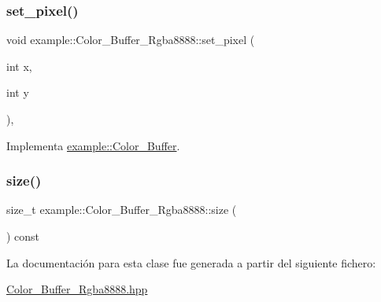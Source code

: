 \mbox{\label{classexample_1_1_color___buffer___rgba8888_aceb94fbc6797177c5a401f4d10d56766}} 
\subsubsection{\texorpdfstring{set\_pixel()}{set\_pixel()}\hspace{0.1cm}{\footnotesize\ttfamily [2/2]}}
{\footnotesize\ttfamily void example\+::\+Color\+\_\+\+Buffer\+\_\+\+Rgba8888\+::set\+\_\+pixel (\begin{DoxyParamCaption}\item[{int}]{x,  }\item[{int}]{y }\end{DoxyParamCaption})\hspace{0.3cm}{\ttfamily [inline]}, {\ttfamily [virtual]}}



Implementa \mbox{\hyperlink{classexample_1_1_color___buffer_a967ea326ec0889a36db523727a8154b5}{example\+::\+Color\+\_\+\+Buffer}}.

\mbox{\label{classexample_1_1_color___buffer___rgba8888_a635f30dda6b8e1851b444ff6e0d2a092}} 
\subsubsection{\texorpdfstring{size()}{size()}}
{\footnotesize\ttfamily size\+\_\+t example\+::\+Color\+\_\+\+Buffer\+\_\+\+Rgba8888\+::size (\begin{DoxyParamCaption}{ }\end{DoxyParamCaption}) const\hspace{0.3cm}{\ttfamily [inline]}}



La documentación para esta clase fue generada a partir del siguiente fichero\+:\begin{DoxyCompactItemize}
\item 
\mbox{\hyperlink{_color___buffer___rgba8888_8hpp}{Color\+\_\+\+Buffer\+\_\+\+Rgba8888.\+hpp}}\end{DoxyCompactItemize}
